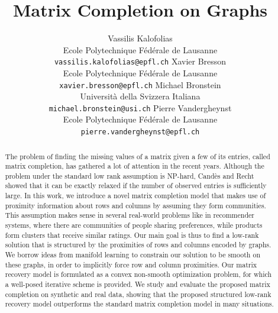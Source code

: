 \documentclass{article}
\title{Matrix Completion on Graphs}
\author{
Vassilis Kalofolias\\
Ecole Polytechnique F\'ed\'erale de Lausanne\\
\texttt{vassilis.kalofolias@epfl.ch}
\And
Xavier Bresson\\
Ecole Polytechnique F\'ed\'erale de Lausanne\\
\texttt{xavier.bresson@epfl.ch}
\And
Michael Bronstein\\
Universit\`a della Svizzera Italiana\\
\texttt{michael.bronstein@usi.ch}
\And
Pierre Vandergheynst\\
Ecole Polytechnique F\'ed\'erale de Lausanne\\
\texttt{pierre.vandergheynst@epfl.ch}
}
\begin{document}
\maketitle




\begin{abstract}
\vspace{-0.15cm}
The problem of finding the missing values of a matrix given a few of its entries, called matrix completion, has gathered a lot of attention in the recent years. Although the problem under the standard low rank assumption is NP-hard, Cand\`es and Recht showed that it can be exactly relaxed if the number of observed entries is sufficiently large. In this work, we introduce a novel matrix completion model that makes use of proximity information about rows and columns by assuming they form communities. This assumption makes sense in several real-world problems like in recommender systems, where there are communities of people sharing preferences, while products form clusters that receive similar ratings. Our main goal is thus to find a low-rank solution that is structured by the proximities of rows and columns encoded by graphs. We borrow ideas from manifold learning to constrain our solution to be smooth on these graphs, in order to implicitly force row and column proximities. Our matrix recovery model is formulated as a convex non-smooth optimization problem, for which a well-posed iterative scheme is provided. We study and evaluate the proposed matrix completion on synthetic and real data, showing that the proposed structured low-rank recovery model outperforms  the standard matrix completion model in many situations.
\end{abstract}



\vspace{-0.1cm}
\end{document}
